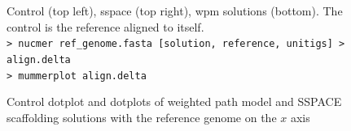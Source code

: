 \documentclass[12pt]{article}
\begin{document}
\begin{figure}[h!]
\begin{center}
{
}
\end{center}
\caption{Control dotplot and dotplots of weighted path model and SSPACE scaffolding solutions with the reference genome on the $x$ axis}
\footnotesize Control (top left), sspace (top right), wpm solutions (bottom). The control is the reference aligned to itself.\\ \texttt{> nucmer ref\_genome.fasta [solution, reference, unitigs] > align.delta} \\ \texttt{> mummerplot align.delta}
\label{dotplotsols}
\end{figure}
\end{document}
